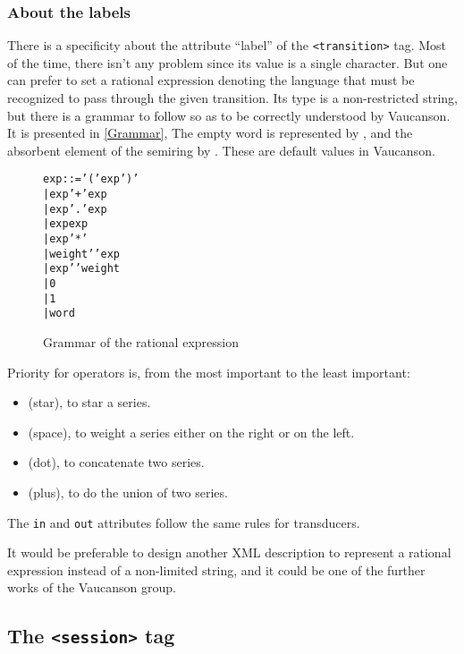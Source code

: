 \documentclass[a4paper]{article}
\newcommand{\Vauc}{{\sc Vaucanson}\xspace}
\newcommand{\xtag}[1]{\texttt{<#1>}}
\def\transitiontag{\xtag{transition}}
\def\sessiontag{\xtag{session}}
\begin{document}
\subsubsection{About the labels}

There is a specificity about the attribute ``label'' of the
\transitiontag{} tag. Most of the time, there isn't any problem since
its value is a single character. But one can prefer to set a rational
expression denoting the language that must be recognized to pass
through the given transition. Its type is a non-restricted string, but
there is a grammar to follow so as to be correctly understood by
\Vauc. It is presented in \autoref{Grammar}, The empty word is
represented by , and the absorbent element of the semiring by
.  These are default values in \Vauc.

\begin{figure}[ht]
  \small
  \begin{center}
\begin{alltt}
     exp ::= '(' exp ')'
         |   exp '+' exp
         |   exp '.' exp
         |   exp exp
         |   exp '*'
         |   weight ' ' exp
         |   exp ' ' weight
         |   0
         |   1
         |   word
\end{alltt}

\caption{Grammar of the rational expression}
\label{Grammar}
  \end{center}
\end{figure}

Priority for operators is, from the most important to the least
important:
\begin{itemize}
\item \samp{*} (star), to star a series.
\item \samp{ } (space), to weight a series either on the right or on
  the left.
\item {} (dot), to concatenate two series.
\item \samp{+} (plus), to do the union of two series.
\end{itemize}

The \verb|in| and \verb|out| attributes follow the same rules for
transducers.

It would be preferable to design another XML description to represent a rational
expression instead of a non-limited string, and it could be one of the further
works of the \Vauc{} group.

\subsection{The \sessiontag{} tag}
\end{document}
